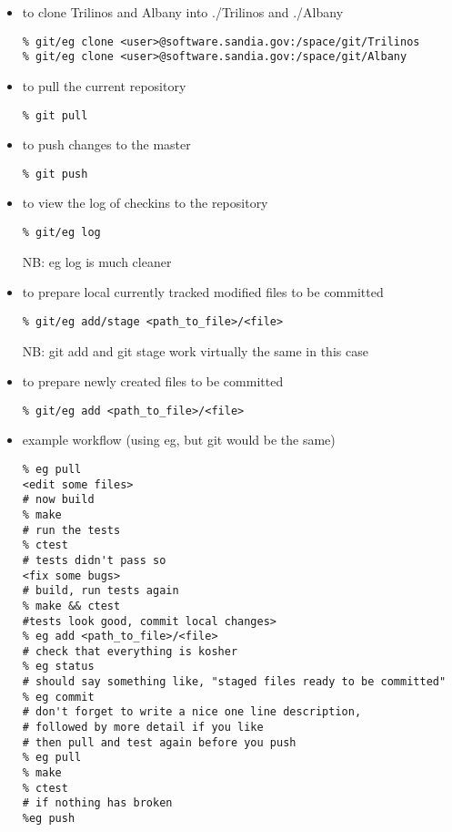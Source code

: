 \documentclass[pdf,12pt,report,strict]{SANDreport}
\theoremstyle{remark}
\begin{document}
\begin{itemize}
\item to clone Trilinos and Albany into ./Trilinos and ./Albany
\begin{verbatim}
% git/eg clone <user>@software.sandia.gov:/space/git/Trilinos
% git/eg clone <user>@software.sandia.gov:/space/git/Albany
\end{verbatim}

\item to pull the current repository
\begin{verbatim}
% git pull
\end{verbatim}

\item to push changes to the master
\begin{verbatim}
% git push
\end{verbatim}

\item to view the log of checkins to the repository
\begin{verbatim}
% git/eg log
\end{verbatim}
NB: eg log is much cleaner

\item to prepare local currently tracked modified files to be committed
\begin{verbatim}
% git/eg add/stage <path_to_file>/<file>
\end{verbatim}
NB: git add and git stage work virtually the same in this case

\item to prepare newly created files to be committed
\begin{verbatim}
% git/eg add <path_to_file>/<file>
\end{verbatim}

\item example workflow (using eg, but git would be the same)
\begin{verbatim}
% eg pull
<edit some files>
# now build
% make
# run the tests
% ctest
# tests didn't pass so 
<fix some bugs>
# build, run tests again
% make && ctest
#tests look good, commit local changes>
% eg add <path_to_file>/<file>
# check that everything is kosher
% eg status
# should say something like, "staged files ready to be committed"
% eg commit
# don't forget to write a nice one line description, 
# followed by more detail if you like
# then pull and test again before you push
% eg pull
% make
% ctest
# if nothing has broken
%eg push
\end{verbatim}


\end{itemize}
\end{document}
